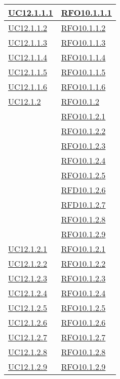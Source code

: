 \begin{longtable}{|>{\centering}m{5cm}|m{5cm}<{\centering}|}
\hyperlink{UC12.1.1.1}{UC12.1.1.1} & \hyperlink{RFO10.1.1.1}{RFO10.1.1.1}\\\hline
\hyperlink{UC12.1.1.2}{UC12.1.1.2} & \hyperlink{RFO10.1.1.2}{RFO10.1.1.2}\\\hline
\hyperlink{UC12.1.1.3}{UC12.1.1.3} & \hyperlink{RFO10.1.1.3}{RFO10.1.1.3}\\\hline
\hyperlink{UC12.1.1.4}{UC12.1.1.4} & \hyperlink{RFO10.1.1.4}{RFO10.1.1.4}\\\hline
\hyperlink{UC12.1.1.5}{UC12.1.1.5} & \hyperlink{RFO10.1.1.5}{RFO10.1.1.5}\\\hline
\hyperlink{UC12.1.1.6}{UC12.1.1.6} & \hyperlink{RFO10.1.1.6}{RFO10.1.1.6}\\\hline

\hyperlink{UC12.1.2}{UC12.1.2}
& \hyperlink{RFO10.1.2}{RFO10.1.2}\\
& \hyperlink{RFO10.1.2.1}{RFO10.1.2.1}\\
& \hyperlink{RFO10.1.2.2}{RFO10.1.2.2}\\
& \hyperlink{RFO10.1.2.3}{RFO10.1.2.3}\\
& \hyperlink{RFO10.1.2.4}{RFO10.1.2.4}\\
& \hyperlink{RFO10.1.2.5}{RFO10.1.2.5}\\
& \hyperlink{RFD10.1.2.6}{RFD10.1.2.6}\\
& \hyperlink{RFD10.1.2.7}{RFD10.1.2.7}\\
& \hyperlink{RFO10.1.2.8}{RFO10.1.2.8}\\
& \hyperlink{RFO10.1.2.9}{RFO10.1.2.9}\\\hline

\hyperlink{UC12.1.2.1}{UC12.1.2.1} & \hyperlink{RFO10.1.2.1}{RFO10.1.2.1}\\\hline
\hyperlink{UC12.1.2.2}{UC12.1.2.2} & \hyperlink{RFO10.1.2.2}{RFO10.1.2.2}\\\hline
\hyperlink{UC12.1.2.3}{UC12.1.2.3} & \hyperlink{RFO10.1.2.3}{RFO10.1.2.3}\\\hline
\hyperlink{UC12.1.2.4}{UC12.1.2.4} & \hyperlink{RFO10.1.2.4}{RFO10.1.2.4}\\\hline
\hyperlink{UC12.1.2.5}{UC12.1.2.5} & \hyperlink{RFO10.1.2.5}{RFO10.1.2.5}\\\hline
\hyperlink{UC12.1.2.6}{UC12.1.2.6} & \hyperlink{RFO10.1.2.6}{RFO10.1.2.6}\\\hline
\hyperlink{UC12.1.2.7}{UC12.1.2.7} & \hyperlink{RFO10.1.2.7}{RFO10.1.2.7}\\\hline
\hyperlink{UC12.1.2.8}{UC12.1.2.8} & \hyperlink{RFO10.1.2.8}{RFO10.1.2.8}\\\hline
\hyperlink{UC12.1.2.9}{UC12.1.2.9} & \hyperlink{RFO10.1.2.8}{RFO10.1.2.9}\\\hline


\end{longtable}

